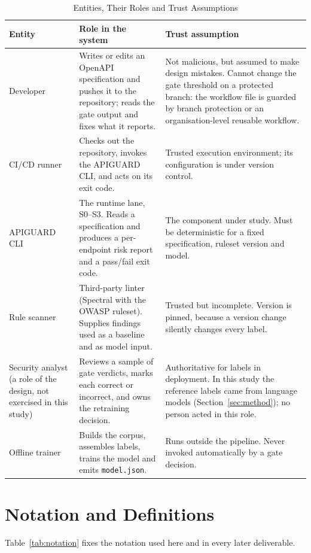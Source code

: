 \documentclass[conference]{IEEEtran}
\begin{document}
\begin{table}[!t]
\caption{Entities, Their Roles and Trust Assumptions}
\label{tab:entities}
\centering
\footnotesize
\begin{tabularx}{\textwidth}{L{2.4cm} Y Y}
\toprule
\textbf{Entity} & \textbf{Role in the system} & \textbf{Trust assumption}\\
\midrule
Developer & Writes or edits an OpenAPI specification and pushes it to the repository; reads
the gate output and fixes what it reports. & Not malicious, but assumed to make design
mistakes. Cannot change the gate threshold on a protected branch: the workflow file is guarded
by branch protection or an organisation-level reusable workflow.\\
CI/CD runner & Checks out the repository, invokes the APIGUARD CLI, and acts on its exit
code. & Trusted execution environment; its configuration is under version control.\\
APIGUARD CLI & The runtime lane, S0--S3. Reads a specification and produces a per-endpoint
risk report and a pass/fail exit code. & The component under study. Must be deterministic
for a fixed specification, ruleset version and model.\\
Rule scanner & Third-party linter (Spectral with the OWASP ruleset). Supplies findings used
as a baseline and as model input. & Trusted but incomplete. Version is pinned, because a
version change silently changes every label.\\
Security analyst (a role of the design, not exercised in this study) & Reviews a sample of gate verdicts, marks each correct or incorrect, and
owns the retraining decision. & Authoritative for labels in deployment. In this study the reference labels came from language
models (Section~\ref{sec:method}); no person acted in this role.\\
Offline trainer & Builds the corpus, assembles labels, trains the model and emits
\texttt{model.json}. & Runs outside the pipeline. Never invoked automatically by a gate
decision.\\
\bottomrule
\end{tabularx}
\end{table}

\section{Notation and Definitions}
Table~\ref{tab:notation} fixes the notation used here and in every later deliverable.
\end{document}
